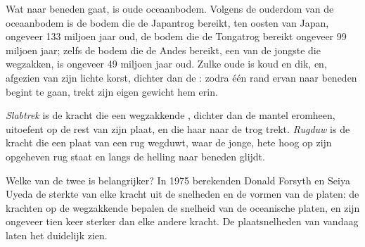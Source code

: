 Wat naar beneden gaat, is oude oceaanbodem. Volgens de ouderdom van de oceaanbodem
is de bodem die de Japantrog bereikt, ten oosten van Japan, ongeveer 133 miljoen jaar oud,
de bodem die de Tongatrog bereikt ongeveer 99 miljoen jaar; zelfs de
bodem die de Andes bereikt, een van de jongste die wegzakken, is ongeveer 49
miljoen jaar oud. Zulke oude  is koud en dik, en, afgezien van
zijn lichte korst, dichter dan de : zodra één rand ervan
naar beneden begint te gaan, trekt zijn eigen gewicht hem erin.

\begin{definition}\label{def:g11:subduction-zones:slab-pull}
\emph{Slabtrek} is de kracht die een wegzakkende , dichter
dan de mantel eromheen, uitoefent op de rest van zijn plaat, en die haar naar
de trog trekt. \emph{Rugduw} is de kracht die een
plaat van een rug wegduwt, waar de jonge, hete  hoog op zijn
opgeheven rug staat en langs de helling naar beneden glijdt.
\end{definition}

Welke van de twee is belangrijker? In 1975 berekenden Donald Forsyth en Seiya Uyeda
de sterkte van elke kracht uit de snelheden en de vormen van
de platen: de krachten op de wegzakkende  bepalen de snelheid van de oceanische platen,
en zijn ongeveer tien keer sterker dan elke andere kracht. De
plaatsnelheden van vandaag laten het duidelijk zien.

